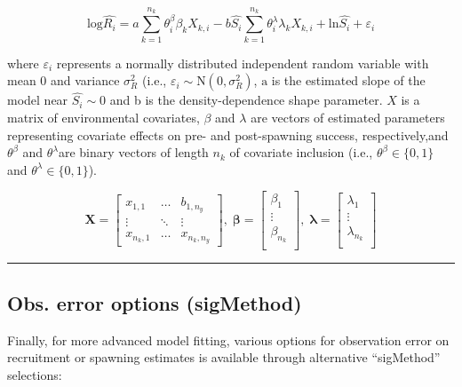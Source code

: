 \documentclass[
]{article}
\begin{document}
\[\mathrm{log}\hat{R_i}= a \sum_{k=1}^{n_k}{\theta_i^{\beta}\beta_k X_{k,i}} -b\hat{S_i}\sum_{k=1}^{n_k}{\theta_i^{\lambda}\lambda_k X_{k,i}}+\mathrm{ln}\hat{S_i}+\varepsilon_i \]

where \(\varepsilon_i\) represents a normally distributed independent
random variable with mean 0 and variance \(\sigma^2_R\) (i.e.,
\(\varepsilon_i\sim \mathrm N(0,\sigma^2_R)\), \(\mathrm a\) is the
estimated slope of the model near \(\hat{S_i}\sim0\) and b is the
density-dependence shape parameter. \({X}\) is a matrix of environmental
covariates, \(\beta\) and \(\lambda\) are vectors of estimated
parameters representing covariate effects on pre- and post-spawning
success, respectively,and \(\theta^{\beta}\) and \(\theta^{\lambda}\)are
binary vectors of length \(n_k\) of covariate inclusion (i.e.,
\({\theta^{\beta}} \in \{0,1 \}\) and
\({\theta^{\lambda}} \in \{0,1 \}\)).

\[\mathbf{X} = \left[\begin{array}
{rrr}
x_{1,1} & \dots  & b_{1,n_y} \\
\vdots & \ddots & \vdots \\
x_{n_k,1} & \dots  & x_{n_k,n_y}
\end{array}\right],\;
\mathbf{\beta} = \left[\begin{array}
{rrr}
\beta_1 \\
\vdots  \\
\beta_{n_k} \\
\end{array}\right],\;
\mathbf{\lambda} = \left[\begin{array}
{rrr}
\lambda_1 \\
\vdots  \\
\lambda_{n_k}\\
\end{array}\right]
\]

\begin{center}\rule{0.5\linewidth}{0.5pt}\end{center}

\hypertarget{obs.-error-options-sigmethod}{%
\subsection{Obs. error options
(sigMethod)}\label{obs.-error-options-sigmethod}}

Finally, for more advanced model fitting, various options for
observation error on recruitment or spawning estimates is available
through alternative ``sigMethod'' selections:
\end{document}
